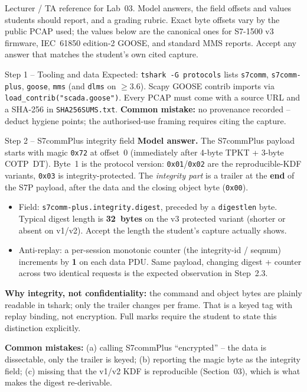 \documentclass[11pt,a4paper]{article}
\begin{document}
\labheader

\begin{goalbox}
Lecturer / TA reference for Lab~03. Model answers, the field offsets and
values students should report, and a grading rubric. Exact byte offsets
vary by the public PCAP used; the values below are the canonical ones for
S7-1500 v3 firmware, IEC~61850 edition-2 GOOSE, and standard MMS reports.
Accept any answer that matches the student's own cited capture.
\end{goalbox}

\begin{solutionbox}{Step 1 -- Tooling and data}
Expected: \texttt{tshark -G protocols} lists \texttt{s7comm},
\texttt{s7comm-plus}, \texttt{goose}, \texttt{mms} (and \texttt{dlms} on
$\ge$3.6). Scapy GOOSE contrib imports via
\texttt{load\_contrib("scada.goose")}. Every PCAP must come with a source
URL and a SHA-256 in \texttt{SHA256SUMS.txt}. \textbf{Common mistake:}
no provenance recorded -- deduct hygiene points; the authorised-use
framing requires citing the capture.
\end{solutionbox}

\begin{solutionbox}{Step 2 -- S7commPlus integrity field}
\textbf{Model answer.} The S7commPlus payload starts with magic
\texttt{0x72} at offset~0 (immediately after 4-byte TPKT + 3-byte
COTP~DT). Byte~1 is the protocol version: \texttt{0x01}/\texttt{0x02} are
the reproducible-KDF variants, \texttt{0x03} is integrity-protected.
The \emph{integrity part} is a trailer at the \textbf{end} of the S7P
payload, after the data and the closing object byte (\texttt{0x00}).
\begin{itemize}\setlength{\itemsep}{1pt}
  \item Field: \texttt{s7comm-plus.integrity.digest}, preceded by a
        \texttt{digestlen} byte. Typical digest length is
        \textbf{32~bytes} on the v3 protected variant (shorter or absent on
        v1/v2). Accept the length the student's capture actually shows.
  \item Anti-replay: a per-session monotonic counter
        (the integrity-id / seqnum) increments by \textbf{1} on each data
        PDU. Same payload, changing digest + counter across two identical
        requests is the expected observation in Step~2.3.
\end{itemize}
\textbf{Why integrity, not confidentiality:} the command and object bytes
are plainly readable in tshark; only the trailer changes per frame. That
is a keyed tag with replay binding, not encryption. Full marks require the
student to state this distinction explicitly.

\textbf{Common mistakes:} (a) calling S7commPlus ``encrypted'' -- the
data is dissectable, only the trailer is keyed; (b) reporting the magic
byte as the integrity field; (c) missing that the v1/v2 KDF is reproducible
(Section~03), which is what makes the digest re-derivable.
\end{solutionbox}
\end{document}
